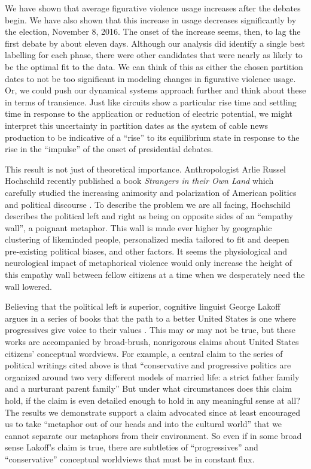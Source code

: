 We have shown that average figurative violence usage increases after the
debates begin. We have also shown that this increase in usage decreases
significantly by the election, November 8, 2016. The onset of the increase
seems, then, to lag the first debate by about eleven days. Although our analysis
did identify a single best labelling for each phase, there were other candidates
that were nearly as likely to be the optimal fit to the data. We can think of
this as either the chosen partition dates to not be too significant in 
modeling changes in figurative violence usage. Or, we could push our 
dynamical systems approach further and think about these in terms of transience.
Just like circuits show a particular rise time and settling time in response
to the application or reduction of electric potential, we might interpret this
uncertainty in partition dates as the system of cable news production to be
indicative of a ``rise'' to its equilibrium state in response to the rise in
the ``impulse'' of the onset of presidential debates.

This result is not just of theoretical importance. Anthropologist
Arlie Russel Hochschild recently published a book \textit{Strangers in their
Own Land} which carefully studied the increasing animosity and 
polarization of American politics and political discourse \cite{Hochschild2016}.
To describe the problem we are all facing, Hochschild 
describes the political left and right as being on opposite sides of
an ``empathy wall'', a poignant metaphor. 
This wall is made ever higher by geographic clustering of likeminded people,
personalized media tailored to fit and deepen pre-existing political biases, and other 
factors. It seems the physiological and neurological impact of metaphorical
violence would only increase the height of this empathy wall between fellow citizens at a time
when we desperately need the wall lowered.

Believing that the political left is superior, cognitive linguist George Lakoff
argues in a series of books that the path to a better United States is 
one where progressives give voice to their values 
\cite{Lakoff1996, Lakoff2004, Lakoff2008, Lakoff2012}. 
This may or may not be true, 
but these works are accompanied by broad-brush, nonrigorous claims about United
States citizens' conceptual wordviews. For example, a central
claim to the series of political writings cited above 
is that ``conservative and progressive politics are organized around 
two very different models of married life: a strict father family and a 
nurturant parent family'' \cite[p.47]{Lakoff2004} But
under what circumstances does this claim hold, if the claim is even detailed
enough to hold in any meaningful sense at all? The results we demonstrate
support a claim advocated since at least  
encouraged us to take ``metaphor out of our heads and into the cultural
world'' that 
we cannot separate our metaphors from their environment. So even if in some
broad sense Lakoff's claim is true, there are subtleties of ``progressives''
and ``conservative'' conceptual worldviews that must be in constant flux.

